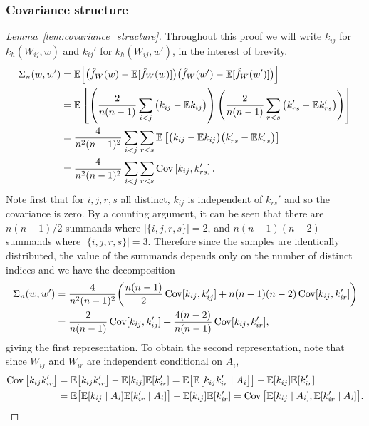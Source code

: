 \subsubsection{Covariance structure}

\begin{proof}[Lemma~\ref{lem:covariance_structure}]

  Throughout this proof we will write
  $k_{i j}$ for $k_h(W_{i j},w)$
  and
  $k_{i j}'$ for $k_h(W_{i j},w')$,
  in the interest of brevity.
  \begin{align*}
    \Sigma_n(w,w')
    &=
    \mathbb{E}\Big[
      \big(
        \hat f_W(w)
        - \mathbb{E}[\hat f_W(w)]
      \big)
      \big(
        \hat f_W(w')
        - \mathbb{E}[\hat f_W(w')]
      \big)
    \Big] \\
    &=
    \mathbb{E}\left[
      \left(
        \frac{2}{n(n-1)}
        \sum_{i<j}
        \big(
          k_{i j} - \mathbb{E} k_{i j}
        \big)
      \right)
      \left(
        \frac{2}{n(n-1)}
        \sum_{r<s}
        \big(
          k_{rs}' - \mathbb{E} k_{rs}'
        \big)
      \right)
    \right] \\
    &=
    \frac{4}{n^2(n-1)^2}
    \sum_{i<j}
    \sum_{r<s}
    \mathbb{E}\left[
      \big(
        k_{i j} - \mathbb{E} k_{i j}
      \big)
      \big(
        k_{rs}' - \mathbb{E} k_{rs}'
      \big)
    \right] \\
    &=
    \frac{4}{n^2(n-1)^2}
    \sum_{i<j}
    \sum_{r<s}
    \operatorname{Cov}\left[
      k_{i j},
      k_{rs}'
    \right].
  \end{align*}
  Note first that
  for $i,j,r,s$ all distinct,
  $k_{i j}$ is independent of $k_{rs}'$
  and so the covariance is zero.
  By a counting argument,
  it can be seen that
  there are
  $n(n-1)/2$
  summands where
  $|\{i,j,r,s\}| = 2$,
  and
  $n(n-1)(n-2)$
  summands where
  $|\{i,j,r,s\}| = 3$.
  Therefore since the samples
  are identically distributed,
  the value of the summands
  depends only on the number of distinct indices
  and we have the decomposition
  \begin{align*}
    \Sigma_n(w,w')
    &=
    \frac{4}{n^2(n-1)^2}
    \bigg(
      \frac{n(n-1)}{2}
      \operatorname{Cov}[k_{i j}, k_{i j}']
      + n(n-1)(n-2)
      \operatorname{Cov}[k_{i j}, k_{i r}']
    \bigg) \\
    &=
    \frac{2}{n(n-1)}
    \operatorname{Cov}[k_{i j}, k_{i j}']
    + \frac{4(n-2)}{n(n-1)}
    \operatorname{Cov}[k_{i j}, k_{i r}'],
  \end{align*}
  giving the first representation.
  To obtain the second representation,
  note that since
  $W_{i j}$ and $W_{i r}$
  are independent conditional
  on $A_i$,
  \begin{align*}
    \operatorname{Cov}\big[
      k_{i j}
      k_{i r}'
    \big]
    &=
    \mathbb{E}\big[
      k_{i j}
      k_{i r}'
    \big]
    -
    \mathbb{E}[k_{i j}]
    \mathbb{E}[k_{i r}']
    =
    \mathbb{E}\big[
      \mathbb{E}\big[
        k_{i j}
        k_{i r}'
        \mid A_i
      \big]
    \big]
    -
    \mathbb{E}[k_{i j}]
    \mathbb{E}[k_{i r}'] \\
    &=
    \mathbb{E}\big[
      \mathbb{E}[k_{i j} \mid A_i]
      \mathbb{E}[k_{i r}' \mid A_i]
    \big]
    -
    \mathbb{E}[k_{i j}]
    \mathbb{E}[k_{i r}']
    =
    \operatorname{Cov}\big[
      \mathbb{E}[k_{i j} \mid A_i],
      \mathbb{E}[k_{i r}' \mid A_i]
    \big].
  \end{align*}
\end{proof}

